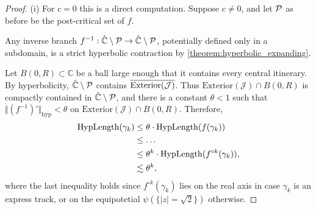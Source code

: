 \begin{proof} \leavevmode
(i) For $c=0$ this is a direct computation. 
Suppose $c \neq0$, and let $\operatorname{\mathcal P}$ as before be the post-critical set of $f$.





Any inverse branch $f^{-1}: \hat{\mathbb C} \setminus \operatorname{\mathcal P} \to \hat{\mathbb C} \setminus \operatorname{\mathcal P}$, 
potentially defined only in a subdomain,
is a strict hyperbolic contraction by \cref{theorem:hyperbolic_expanding}.


Let $B(0,R) \subset \mathbb{C}$ be a ball large enough that it contains every central itinerary. 
By hyperbolicity, $\hat{\mathbb C} \setminus \operatorname{\mathcal P}$ contains $\overline{\operatorname{Exterior}(\mathcal{J})}$.
Thus $\mathrm{Exterior}(\mathcal{J}) \cap B(0,R)$ is compactly contained in $\hat{\mathbb C} \setminus \operatorname{\mathcal P}$, and
there is a constant $\theta<1$ such that $\Vert (f^{-1})' \Vert _{\mathrm{hyp}}< \theta$ on $\mathrm{Exterior}(\mathcal{J}) \cap B(0,R)$. Therefore,
\begin{align*}
\operatorname{HypLength}(\gamma_k)  & \leq \theta \cdot \operatorname{HypLength}(f(\gamma_k))\\ & \leq  \dots
	\\ & \leq \theta^k \cdot \operatorname{HypLength}(f^{\circ k}(\gamma_k)),
	\\ & \lesssim \theta^k,
\end{align*}
where the last inequality holds since $f^{\circ k}(\gamma_k)$ lies 
on the real axis in case $\gamma_k$ is an express track, 
or on the equipotetial $\psi(\{ |z| = \sqrt 2\})$ otherwise.


\end{proof}
